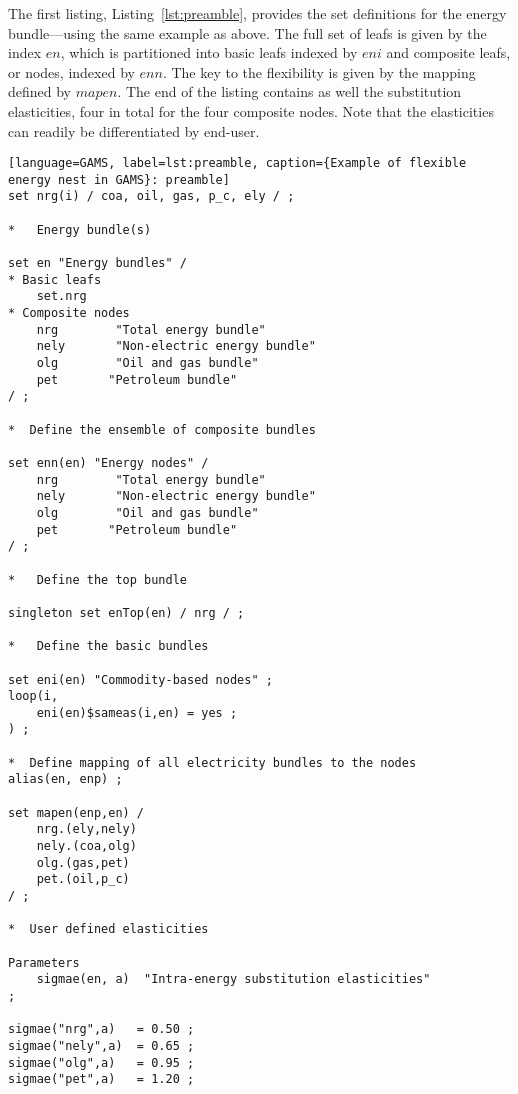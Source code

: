 The first listing, Listing~\ref{lst:preamble}, provides
the set definitions for the energy bundle---using the
same example as above. The full set of leafs is
given by the index $\mathit{en}$, which is partitioned
into basic leafs indexed by $\mathit{eni}$ and composite leafs, or
nodes, indexed by $\mathit{enn}$. The key to the flexibility
is given by the mapping defined by $\mathit{mapen}$. The end
of the listing contains as well the substitution elasticities,
four in total for the four composite nodes. Note that the
elasticities can readily be differentiated by end-user.

\begin{lstlisting}[language=GAMS, label=lst:preamble, caption={Example of flexible energy nest in GAMS}: preamble]
set nrg(i) / coa, oil, gas, p_c, ely / ;

*   Energy bundle(s)

set en "Energy bundles" /
* Basic leafs
    set.nrg
* Composite nodes
    nrg        "Total energy bundle"
    nely       "Non-electric energy bundle"
    olg        "Oil and gas bundle"
    pet       "Petroleum bundle"
/ ;

*  Define the ensemble of composite bundles

set enn(en) "Energy nodes" /
    nrg        "Total energy bundle"
    nely       "Non-electric energy bundle"
    olg        "Oil and gas bundle"
    pet       "Petroleum bundle"
/ ;

*   Define the top bundle

singleton set enTop(en) / nrg / ;

*   Define the basic bundles

set eni(en) "Commodity-based nodes" ;
loop(i,
    eni(en)$sameas(i,en) = yes ;
) ;

*  Define mapping of all electricity bundles to the nodes
alias(en, enp) ;

set mapen(enp,en) /
    nrg.(ely,nely)
    nely.(coa,olg)
    olg.(gas,pet)
    pet.(oil,p_c)
/ ;

*  User defined elasticities

Parameters
    sigmae(en, a)  "Intra-energy substitution elasticities"
;

sigmae("nrg",a)   = 0.50 ;
sigmae("nely",a)  = 0.65 ;
sigmae("olg",a)   = 0.95 ;
sigmae("pet",a)   = 1.20 ;
\end{lstlisting}

